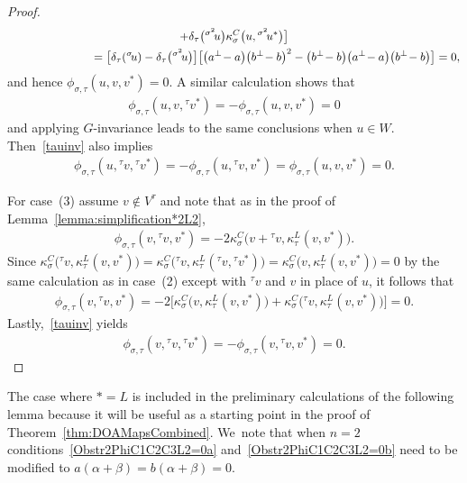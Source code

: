 \documentclass[pdftex]{sigma}
\numberwithin{equation}{section}
\newcommand{\actby}[1]{{}^{#1}}
\newcommand{\actbylessspace}[1]{{}^{#1}\!}
\begin{document}
\begin{proof}
\begin{gather*}
+\delta_{\tau}\big(\actbylessspace{\sigma^2}u\big)\kappa^C_{\sigma}\big(u,\actbylessspace{\sigma^2}u^*\big)\big]
\\ \hphantom{\kappa^C_{\sigma}\big(u,\kappa^L_{\tau}(v,v^*)\big)}
=\big[\delta_{\tau}(\actbylessspace{\sigma}u)-\delta_{\tau}\big(\actbylessspace{\sigma^2}u\big)\big]
\big[\big(a^\perp\!-a\big)\big(b^\perp\!-b\big)^2-\big(b^\perp\!-b\big)\big(a^\perp\!-a\big)\big(b^\perp\!-b\big) \big] =0,
\end{gather*}
and hence $\phi_{\sigma,\tau}(u,v,v^*)=0$.
A similar calculation shows that
	\begin{gather*}
\phi_{\sigma,\tau}(u,v,\actbylessspace{\tau}v^*)=-\phi_{\sigma,\tau}(u,v,v^*)=0
\end{gather*}
and applying $G$-invariance
leads to the same conclusions when $u \in W$.
Then~\eqref{tauinv} also implies
\begin{gather*}
\phi_{\sigma,\tau}(u,\actby{\tau}v,\actby{\tau}v^*)=-\phi_{\sigma,\tau}(u,\actby{\tau}v,v^*) =\phi_{\sigma,\tau}(u,v,v^*)=0.
\end{gather*}
	
For case~(3) assume $v \notin V^{\tau}$ and note
that as in the proof of Lemma~\ref{lemma:simplification*2L2},
\begin{gather*}
\phi_{\sigma,\tau}(v,\actbylessspace{\tau}v,v^*)
=-2\kappa^C_{\sigma}\big(v+\actbylessspace{\tau}v,\kappa^L_{\tau}(v,v^*)\big).
\end{gather*}
Since $\kappa^C_{\sigma}\big(\actbylessspace{\tau}v,\kappa^L_{\tau}(v,v^*)\big)
=\kappa^C_{\sigma}\big(\actbylessspace{\tau}v,\kappa^L_{\tau}(\actbylessspace{\tau}v, \actbylessspace{\tau}v^*)\big)
=\kappa^C_{\sigma}\big(v,\kappa^L_{\tau}(v,v^*)\big)
=0$ by the same calculation as in
case~(2) except with $\actbylessspace{\tau}v$ and $v$ in place of $u$, it follows that
\begin{gather*}
\phi_{\sigma,\tau}(v,\actbylessspace{\tau}v,v^*)=
-2\big[\kappa^C_{\sigma}\big(v,\kappa^L_{\tau}(v,v^*)\big)+
\kappa^C_{\sigma}\big(\actbylessspace{\tau}v,\kappa^L_{\tau}(v,v^*)\big)\big]=0.
\end{gather*}
Lastly,~\eqref{tauinv} yields
\begin{gather*}
\phi_{\sigma,\tau}(v,\actby{\tau}v,\actby{\tau}v^*)=-\phi_{\sigma,\tau}(v,\actby{\tau}v,v^*)=0.\tag*{\qed}
\end{gather*}
\renewcommand{\qed}{}
\end{proof}

The case where $*=L$ is included in the preliminary calculations of the following
lemma because it will be useful as a starting point in the proof of
Theorem~\ref{thm:DOAMapsCombined}. We~note that when $n=2$ conditions~\eqref{Obstr2PhiC1C2C3L2=0a} and~\eqref{Obstr2PhiC1C2C3L2=0b} need to be modified to $a(\alpha+\beta)=b(\alpha+\beta)=0$.
\end{document}
